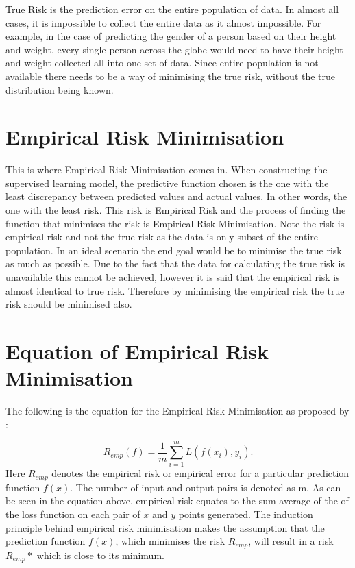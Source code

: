 True Risk is the prediction error on the entire population of data. In almost all cases, it is impossible to collect the entire data as it almost impossible. For example, in the case of predicting the gender of a person based on their height and weight, every single person across the globe would need to have their height and weight collected all into one set of data. Since entire population is not available there needs to be a way of minimising the true risk, without the true distribution being known. 

\section{Empirical Risk Minimisation}
This is where Empirical Risk Minimisation comes in. When constructing the supervised learning model, the predictive function chosen is the one with the  least discrepancy between predicted values and actual values. In other words, the one with the least risk. This risk is Empirical Risk and the process of finding the function that minimises the risk is Empirical Risk Minimisation. Note the risk is empirical risk and not the true risk as the data is only subset of the entire population. In an ideal scenario the end goal would be to minimise the true risk as much as possible. Due to the fact that the data for calculating the true risk is unavailable this cannot be achieved, however it is said that the empirical risk is almost identical to true risk. Therefore by minimising the empirical risk the true risk should be minimised also.

\section{Equation of Empirical Risk Minimisation}

The following is the equation for the Empirical Risk Minimisation as proposed by \citet{Vapnik}\citep{principles}:

\begin{equation}
    R_{emp}(f) = \frac{1}{m} \sum_{i=1}^{m} L(f(x_{i})   ,y_{i}).
\end{equation}
Here $R_{emp}$ denotes the empirical risk or empirical error for a particular prediction function $f(x)$. The number of input and output pairs is denoted as m. As can be seen in the equation above, empirical risk equates to the sum average of the of the loss function on each pair of $x$ and $y$ points generated. The induction principle behind empirical risk minimisation makes the assumption that the prediction function $f(x)$, which minimises the risk $R_{emp}$, will result in a risk $R_{emp}*$ which is close to its minimum. 

